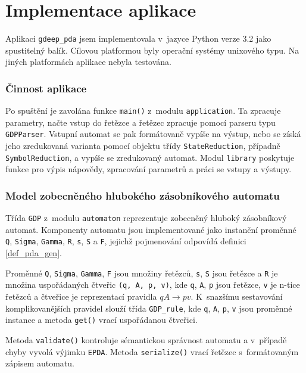 \section{Implementace aplikace}

Aplikaci \texttt{gdeep\_pda} jsem implementovala v~jazyce Python verze 3.2 jako spustitelný balík. Cílovou platformou byly operační systémy unixového typu. Na jiných platformách aplikace nebyla testována.

\subsubsection{Činnost aplikace}

Po spuštění je zavolána funkce \texttt{main()} z~modulu \texttt{application}. Ta zpracuje parametry, načte vstup do řetězce a řetězec zpracuje pomocí parseru typu \texttt{GDPParser}. Vstupní automat se pak formátovaně vypíše na výstup, nebo se získá jeho zredukovaná varianta pomocí objektu třídy \texttt{StateReduction}, případně \texttt{SymbolReduction}, a vypíše se zredukovaný automat. Modul \texttt{library} poskytuje funkce pro výpis nápovědy, zpracování parametrů a práci se vstupy a výstupy.


\subsubsection{Model zobecněného hlubokého zásobníkového automatu}

Třída \texttt{GDP} z~modulu \texttt{automaton} reprezentuje zobecněný hluboký zásobníkový automat. Komponenty automatu jsou implementované jako instanční proměnné \texttt{Q}, \texttt{Sigma}, \texttt{Gamma}, \texttt{R}, \texttt{s}, \texttt{S} a \texttt{F}, jejichž pojmenování odpovídá definici \ref{def_pda_gen}. 

Proměnné \texttt{Q}, \texttt{Sigma}, \texttt{Gamma}, \texttt{F} jsou množiny řetězců, \texttt{s}, \texttt{S} jsou řetězce a \texttt{R} je množina uspořádaných čtveřic \texttt{(q, A, p, v)}, kde \texttt{q}, \texttt{A}, \texttt{p} jsou řetězce, \texttt{v} je n-tice řetězců a čtveřice je reprezentací pravidla $qA \rightarrow pv$. 
K~snazšímu sestavování komplikovanějších pravidel slouží třída \texttt{GDP\_rule}, kde \texttt{q}, \texttt{A}, \texttt{p}, \texttt{v} jsou proměnné instance a metoda \texttt{get()} vrací uspořádanou čtveřici.

Metoda \texttt{validate()} kontroluje sémantickou správnost automatu a v~případě chyby vyvolá výjimku \texttt{EPDA}. Metoda \texttt{serialize()} vrací řetězec s~formátovaným zápisem automatu.

